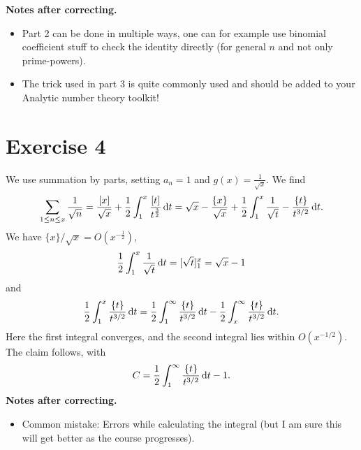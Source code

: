 \documentclass[a4paper,11pt]{article}
\begin{document}
\textbf{Notes after correcting.} \leavevmode
\begin{itemize}
    \item Part 2 can be done in multiple ways, one can for example use binomial coefficient stuff
        to check the identity directly (for general $n$ and not only prime-powers). 
    \item The trick used in part $3$ is quite commonly used and should be
        added to your Analytic number theory toolkit!  
\end{itemize}

\section*{Exercise 4}
We use summation by parts, setting $a_n = 1$ and $g(x) = \frac 1{\sqrt x}$. We find
\[
    \sum_{1 \leq n \leq x} \frac 1 {\sqrt n} = \frac{[x]}{\sqrt x} + \frac 12 \int_1^x
    \frac{[t]}{t^{\frac 32}} \mathrm{\,d} t = \sqrt x - \frac{\{x\}}{\sqrt x} + \frac 12 \int_1^x
    \frac 1{\sqrt t} - \frac{\{t\}}{t^{3/2}} \mathrm{\,d} t.
\]
We have $\{x\}/\sqrt x = O(x^{-\frac12})$,
\[
    \frac 12 \int_1^x \frac 1{\sqrt t} \mathrm{\,d} t= [\sqrt t]_1^x = \sqrt x - 1
\]
and 
\[
    \frac 12 \int_1^x \frac{\{t\}}{t^{3/2}} \mathrm{\,d} t = \frac 12 \int_1^\infty \frac{\{t\}}{t^{3/2}} \mathrm{\,d} t -  \frac 12 \int_x^\infty \frac{\{t\}}{t^{3/2}} \mathrm{\,d} t.
\]
Here the first integral converges, and the second integral lies within $O(x^{-1/2})$. The claim
follows, with 
\[
    C = \frac 12 \int_1^\infty \frac{\{t\}}{t^{3/2}} \mathrm{\,d} t  -1.
\]
\textbf{Notes after correcting.} \leavevmode
\begin{itemize}
    \item Common mistake: Errors while calculating the integral (but I am sure
        this will get better as the course progresses).
\end{itemize}
\contactend
\end{document}
